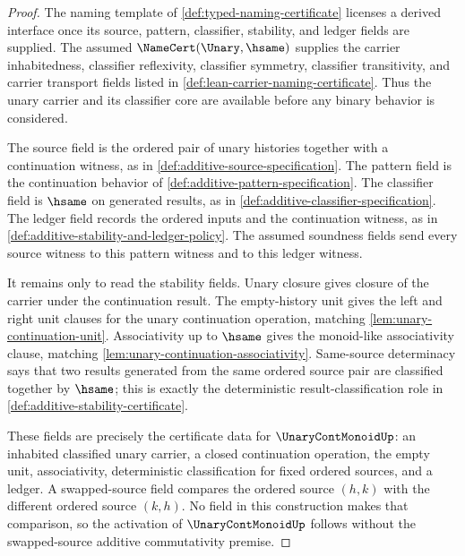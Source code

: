\begin{proof}
The naming template of \autoref{def:typed-naming-certificate} licenses a derived interface once its source, pattern, classifier, stability, and ledger fields are supplied. The assumed $\NameCert(\Unary,\hsame)$ supplies the carrier inhabitedness, classifier reflexivity, classifier symmetry, classifier transitivity, and carrier transport fields listed in \autoref{def:lean-carrier-naming-certificate}. Thus the unary carrier and its classifier core are available before any binary behavior is considered.

The source field is the ordered pair of unary histories together with a continuation witness, as in \autoref{def:additive-source-specification}. The pattern field is the continuation behavior of \autoref{def:additive-pattern-specification}. The classifier field is $\hsame$ on generated results, as in \autoref{def:additive-classifier-specification}. The ledger field records the ordered inputs and the continuation witness, as in \autoref{def:additive-stability-and-ledger-policy}. The assumed soundness fields send every source witness to this pattern witness and to this ledger witness.

It remains only to read the stability fields. Unary closure gives closure of the carrier under the continuation result. The empty-history unit gives the left and right unit clauses for the unary continuation operation, matching \autoref{lem:unary-continuation-unit}. Associativity up to $\hsame$ gives the monoid-like associativity clause, matching \autoref{lem:unary-continuation-associativity}. Same-source determinacy says that two results generated from the same ordered source pair are classified together by $\hsame$; this is exactly the deterministic result-classification role in \autoref{def:additive-stability-certificate}.

These fields are precisely the certificate data for $\UnaryContMonoidUp$: an inhabited classified unary carrier, a closed continuation operation, the empty unit, associativity, deterministic classification for fixed ordered sources, and a ledger. A swapped-source field compares the ordered source $(h,k)$ with the different ordered source $(k,h)$. No field in this construction makes that comparison, so the activation of $\UnaryContMonoidUp$ follows without the swapped-source additive commutativity premise.
\end{proof}

